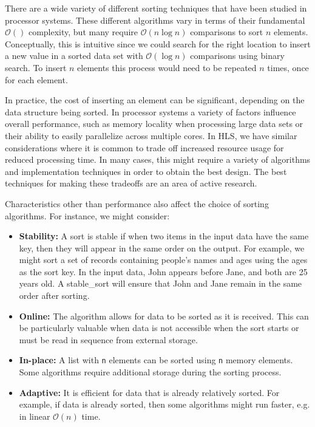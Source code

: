 There are a wide variety of different sorting techniques that have been studied in processor systems\cite{knuth1998art}.  These different algorithms vary in terms of their fundamental $\mathcal{O}()$ complexity, but many require $\mathcal{O}(n \log n)$ comparisons to sort $n$ elements.  Conceptually, this is intuitive since we could search for the right location to insert a new value in a sorted data set with $\mathcal{O}(\log n)$ comparisons using binary search. To insert $n$ elements this process would need to be repeated $n$ times, once for each element.

In practice, the cost of inserting an element can be significant, depending on the data structure being sorted.  In processor systems a variety of factors influence overall performance, such as memory locality when processing large data sets or their ability to easily parallelize across multiple cores.  In HLS, we have similar considerations where it is common to trade off increased resource usage for reduced processing time.  In many cases, this might require a variety of algorithms and implementation techniques in order to obtain the best design.  The best techniques for making these tradeoffs are an area of active research\cite{marcelino2008sorting,mueller2012sorting,matai2016sorting}.

Characteristics other than performance also affect the choice of sorting algorithms.  For instance, we might consider:
\begin{itemize}
\item \textbf{Stability:} A sort is stable if when two items in the input data have the same key, then they will appear in the same order on the output. For example, we might sort a set of records containing people's names and ages using the ages as the sort key. In the input data, John appears before Jane, and both are 25 years old. A \gls{stable_sort} will ensure that John and Jane remain in the same order after sorting.  
\item \textbf{Online:} The algorithm allows for data to be sorted as it is received. This can be particularly valuable when data is not accessible when the sort starts or must be read in sequence from external storage. 
\item \textbf{In-place:} A list with \lstinline{n} elements can be sorted using \lstinline{n} memory elements. Some algorithms require additional storage during the sorting process.
\item \textbf{Adaptive:} It is efficient for data that is already relatively sorted. For example, if data is already sorted, then some algorithms might run faster, e.g. in linear $\mathcal{O}(n)$ time.
\end{itemize}

